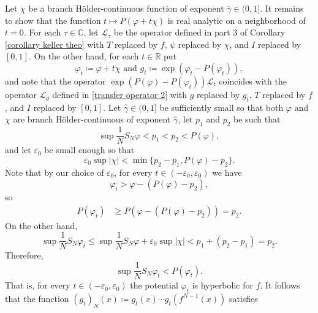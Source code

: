 \documentclass[12pt]{amsart}
\numberwithin{equation}{section} %
\numberwithin{figure}{section} %
\theoremstyle{plain}
\theoremstyle{definition}
\theoremstyle{remark}
\theoremstyle{citing}
\newcommand{\C}{\mathbb{C}}
\newcommand{\R}{\mathbb{R}}
\renewcommand{\=}{\coloneqq}
\begin{document}
Let $\chi$ be a branch Hölder-continuous function of exponent $\overline{\gamma}\in (0,1]$. It remains to show that the function $t\mapsto P(\varphi + t\chi)$ is real analytic on a neighborhood of $t=0$. For each $\tau\in\C$, let $\mathscr{L}_{\tau}$ be the operator defined in part 3 of Corollary \ref{corollary keller theo} with $T$ replaced by $f$, $\psi$ replaced by $\chi$, and $I$ replaced by $[0,1]$. On the other hand, for each $t\in \R$ put
\begin{equation*}
    \varphi_t \= \varphi + t\chi\text{ and } g_t\= \exp(\varphi_t - P(\varphi_t)),
\end{equation*}
and note that the operator $\exp(P(\varphi)-P(\varphi_t))\mathscr{L}_{t}$ coincides with the operator $\mathscr{L}_{g}$ defined in \eqref{transfer operator 2} with $g$ replaced by $g_t$, $T$ replaced by $f$, and $I$ replaced by $[0,1]$. Let $\widehat{\gamma}\in(0,1]$ be sufficiently small so that both $\varphi$ and $\chi$ are branch Hölder-continuous of exponent $\widehat{\gamma}$, let $p_1$ and $p_2$ be such that
\begin{equation*}
    \sup\frac{1}{N}S_N\varphi < p_1 < p_2 < P(\varphi),
\end{equation*}
and let $\varepsilon_0$ be small enough so that
\begin{equation*}
    \varepsilon_0 \sup|\chi| < \min\{p_2-p_1, P(\varphi)-p_2\}.
\end{equation*}
Note that by our choice of $\varepsilon_0$, for every $t\in (-\varepsilon_0,\varepsilon_0)$ we have
\begin{equation*}
    \varphi_t > \varphi - (P(\varphi)-p_2),
\end{equation*}
so
\begin{equation*}
    \begin{split}
        P(\varphi_t)&\geq
         P(\varphi-(P(\varphi)-p_2))=p_2.
    \end{split}
\end{equation*}
On the other hand,
\begin{equation*}
    \sup \frac{1}{N}S_N \varphi_t \leq \sup \frac{1}{N}S_N \varphi + \varepsilon_0\sup |\chi| < p_1 + (p_2-p_1) = p_2. 
\end{equation*}
Therefore,
\begin{equation*}
    \sup\frac{1}{N}S_N\varphi_t < P(\varphi_t).
\end{equation*}
That is, for every $t\in (-\varepsilon_0,\varepsilon_0)$ the potential $\varphi_t$ is hyperbolic for $f$. It follows that the function $(g_t)_N(x) \= g_t(x)\cdots g_t(f^{N-1}(x))$ satisfies 
\end{document}

